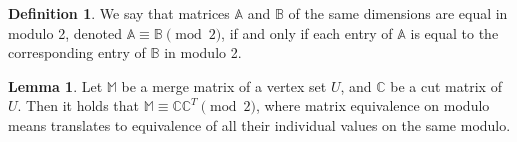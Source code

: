 \documentclass[thesis=M,english,hidelinks]{FITthesis}[2012/10/20]
\theoremstyle{definition}
\newtheorem{definition}{Definition}
\newtheorem{lemma}{Lemma}
\begin{document}
\begin{definition}
    We say that matrices $\mathbb{A}$ and $\mathbb{B}$ of the same dimensions are equal in modulo 2, denoted $\mathbb{A}
    \equiv \mathbb{B} \pmod{2}$, if and only if each entry of $\mathbb{A}$ is equal to the corresponding entry of
    $\mathbb{B}$ in modulo 2.
\end{definition}

\begin{lemma}
    \label{lemma:mergetocut}
    Let $\mathbb{M}$ be a merge matrix of a vertex set $U$, and $\mathbb{C}$ be a cut matrix of $U$. Then it holds
    that $\mathbb{M} \equiv \mathbb{C} \mathbb{C}^T \pmod{2}$, where matrix equivalence on modulo means translates to equivalence
    of all their individual values on the same modulo.
\end{lemma}
\end{document}
